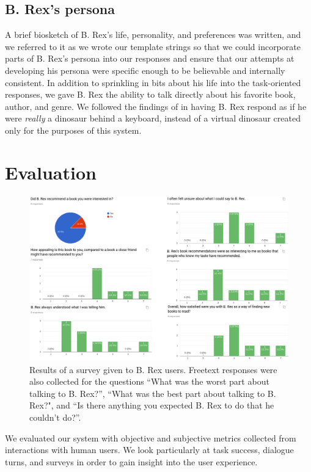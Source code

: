 \documentclass[11pt,a4paper]{article}
\begin{document}
\subsection{B. Rex's persona}

A brief biosketch of B. Rex's life, personality, and preferences was written, and we referred to it as we wrote our template strings so that we could incorporate parts of B. Rex's persona into our responses and ensure that our attempts at developing his persona were specific enough to be believable and internally consistent. In addition to sprinkling in bits about his life into the task-oriented responses, we gave B. Rex the ability to talk directly about his favorite book, author, and genre. We followed the findings of \citeauthor{gilani:16}  in having B. Rex respond as if he were \emph{really} a dinosaur behind a keyboard, instead of a virtual dinosaur created only for the purposes of this system.


\section{Evaluation}

\begin{figure}
    \centering
    \includegraphics[scale=1.40]{results.png}
    \caption{Results of a survey given to B. Rex users. Freetext responses were also collected for the questions ``What was the worst part about talking to B. Rex?'', ``What was the best part about talking to B. Rex?", and ``Is there anything you expected B. Rex to do that he couldn't do?''.}
    \label{fig:results}
\end{figure}

We evaluated our system with objective and subjective metrics collected from interactions with human users. We look particularly at task success, dialogue turns, and surveys in order to gain insight into the user experience. 
\end{document}
